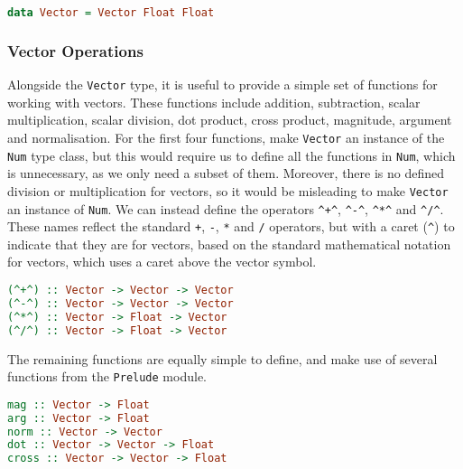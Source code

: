 \documentclass[../main.tex]{subfiles}
\begin{document}
            \begin{lstlisting}[language=Haskell, label={lst:vector}, caption={The Vector type definition.}]
data Vector = Vector Float Float\end{lstlisting}

            \subsubsection{Vector Operations}
                Alongside the \verb|Vector| type, it is useful to provide a simple set of
                    functions for working with vectors.
                These functions include addition, subtraction, scalar multiplication, scalar
                    division, dot product, cross product, magnitude, argument and normalisation.
                For the first four functions, make \verb|Vector| an instance of the \verb|Num|
                    type class, but this would require us to define all the functions in
                    \verb|Num|, which is unnecessary, as we only need a subset of them.
                Moreover, there is no defined division or multiplication for vectors, so it
                    would be misleading to make \verb|Vector| an instance of \verb|Num|.
                We can instead define the operators \verb|^+^|, \verb|^-^|, \verb|^*^| and
                    \verb|^/^|.
                These names reflect the standard \verb|+|, \verb|-|, \verb|*| and \verb|/|
                    operators, but with a caret (\verb|^|) to indicate that they are for vectors,
                    based on the standard mathematical notation for vectors, which uses a caret
                    above the vector symbol.

                \begin{lstlisting}[language=Haskell, label={lst:vectorOps}, morekeywords={Vector}, caption={The vector operators.}]
(^+^) :: Vector -> Vector -> Vector
(^-^) :: Vector -> Vector -> Vector
(^*^) :: Vector -> Float -> Vector
(^/^) :: Vector -> Float -> Vector\end{lstlisting}

                The remaining functions are equally simple to define, and make use of several
                    functions from the \verb|Prelude| module.

                \begin{lstlisting}[language=Haskell, label={lst:vectorFns}, morekeywords={Vector}, caption={The remaining vector functions.}]
mag :: Vector -> Float
arg :: Vector -> Float
norm :: Vector -> Vector
dot :: Vector -> Vector -> Float
cross :: Vector -> Vector -> Float\end{lstlisting}
\end{document}
